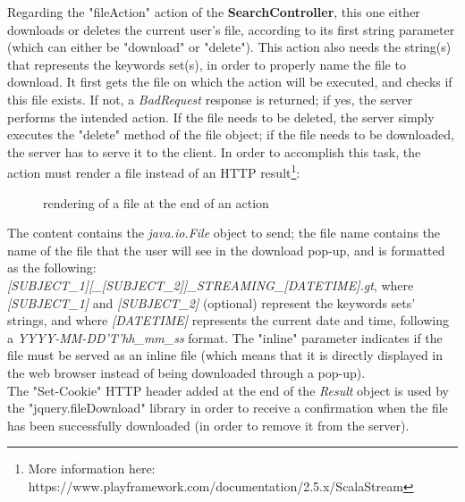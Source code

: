 \documentclass[a4paper,11pt]{report}
\begin{document}
Regarding the "fileAction" action of the \textbf{SearchController}, this one either downloads or deletes the current user's file, according to its first string parameter (which can either be "download" or "delete"). This action also needs the string(s) that represents the keywords set(s), in order to properly name the file to download. It first gets the file on which the action will be executed, and checks if this file exists. If not, a \emph{BadRequest} response is returned; if yes, the server performs the intended action. If the file needs to be deleted, the server simply executes the "delete" method of the file object; if the file needs to be downloaded, the server has to serve it to the client. In order to accomplish this task, the action must render a file instead of an HTTP result\footnote{More information here: https://www.playframework.com/documentation/2.5.x/ScalaStream}:
\begin{figure}[H]
\vspace{-5pt}
\begin{center}
\vspace{-5pt}
\caption{rendering of a file at the end of an action}
\end{center}
\end{figure}
\newpage

The content contains the \emph{java.io.File} object to send; the file name contains the name of the file that the user will see in the download pop-up, and is formatted as the following: \\\emph{[SUBJECT\_1][\_[SUBJECT\_2]]\_STREAMING\_[DATETIME].gt}, where \emph{[SUBJECT\_1]} and \emph{[SUBJECT\_2]} (optional) represent the keywords sets' strings, and where \emph{[DATETIME]} represents the current date and time, following a \emph{YYYY-MM-DD'T'hh\_mm\_ss} format. The "inline" parameter indicates if the file must be served as an inline file (which means that it is directly displayed in the web browser instead of being downloaded through a pop-up).\\

The "Set-Cookie" HTTP header added at the end of the \emph{Result} object is used by the "jquery.fileDownload" library in order to receive a confirmation when the file has been successfully downloaded (in order to remove it from the server).\\
\end{document}
